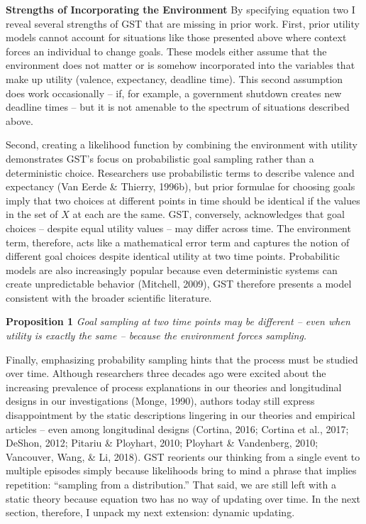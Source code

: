 \documentclass[english,,man]{apa6}
\theoremstyle{definition}
\theoremstyle{definition}
\theoremstyle{definition}
\theoremstyle{remark}
\begin{document}
\textbf{Strengths of Incorporating the Environment} By specifying
equation two I reveal several strengths of GST that are missing in prior
work. First, prior utility models cannot account for situations like
those presented above where context forces an individual to change
goals. These models either assume that the environment does not matter
or is somehow incorporated into the variables that make up utility
(valence, expectancy, deadline time). This second assumption does work
occasionally -- if, for example, a government shutdown creates new
deadline times -- but it is not amenable to the spectrum of situations
described above.

Second, creating a likelihood function by combining the environment with
utility demonstrates GST's focus on probabilistic goal sampling rather
than a deterministic choice. Researchers use probabilistic terms to
describe valence and expectancy (Van Eerde \& Thierry, 1996b), but prior
formulae for choosing goals imply that two choices at different points
in time should be identical if the values in the set of \(X\) at each
are the same. GST, conversely, acknowledges that goal choices -- despite
equal utility values -- may differ across time. The environment term,
therefore, acts like a mathematical error term and captures the notion
of different goal choices despite identical utility at two time points.
Probabilitic models are also increasingly popular because even
deterministic systems can create unpredictable behavior (Mitchell,
2009), GST therefore presents a model consistent with the broader
scientific literature.

\textbf{Proposition 1} \emph{Goal sampling at two time points may be
different -- even when utility is exactly the same -- because the
environment forces sampling.}

Finally, emphasizing probability sampling hints that the process must be
studied over time. Although researchers three decades ago were excited
about the increasing prevalence of process explanations in our theories
and longitudinal designs in our investigations (Monge, 1990), authors
today still express disappointment by the static descriptions lingering
in our theories and empirical articles -- even among longitudinal
designs (Cortina, 2016; Cortina et al., 2017; DeShon, 2012; Pitariu \&
Ployhart, 2010; Ployhart \& Vandenberg, 2010; Vancouver, Wang, \& Li,
2018). GST reorients our thinking from a single event to multiple
episodes simply because likelihoods bring to mind a phrase that implies
repetition: \enquote{sampling from a distribution.} That said, we are
still left with a static theory because equation two has no way of
updating over time. In the next section, therefore, I unpack my next
extension: dynamic updating.
\end{document}
